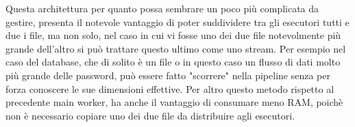 Questa architettura per quanto possa sembrare un poco più complicata da gestire, presenta il notevole vantaggio di poter suddividere tra gli esecutori tutti e due i file, ma non solo, nel caso in cui vi fosse uno dei due file notevolmente più grande dell'altro si può trattare questo ultimo come uno stream. Per esempio nel caso del database, che di solito è un file o in questo caso un flusso di dati molto più grande delle password, può essere fatto "scorrere" nella pipeline senza per forza conoscere le sue dimensioni effettive. Per altro questo metodo rispetto al precedente main worker, ha anche il vantaggio di consumare meno RAM, poichè non è necessario copiare uno dei due file da distribuire agli esecutori. 